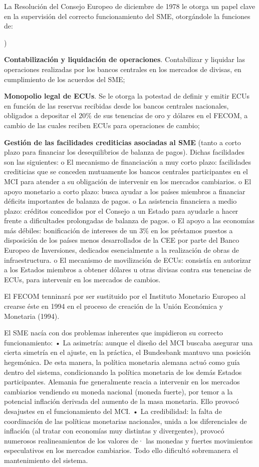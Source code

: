 \documentclass[10pt,a4paper]{article}
\newcounter{alphaitem}
\newenvironment{la}
      {\begin{list}{\alph{alphaitem})}{%
          \usecounter{alphaitem}%
          \setlength{\leftmargin}{1cm}%
          \setlength{\parskip}{3pt}%
          \setlength{\itemsep}{0pt}%
          \setlength{\parsep}{0pt}%
      }}
      {\end{list}}
\begin{document}
La Resolución del Consejo Europeo de diciembre de 1978 le otorga un papel clave en la supervisión del correcto funcionamiento del SME, otorgándole la funciones de:
\begin{la}
    \item \textbf{Contabilización y liquidación de operaciones}. Contabilizar y liquidar las operaciones realizadas por los bancos centrales en los mercados de divisas, en cumplimiento de los acuerdos del SME;
    \item \textbf{Monopolio legal de ECUs}. Se le otorga la potestad de definir y emitir ECUs en función de las reservas recibidas desde los bancos centrales nacionales, obligados a depositar el $20\%$ de sus tenencias de oro y dólares en el FECOM, a cambio de las cuales reciben ECUs para operaciones de cambio;
    \item \textbf{Gestión de las facilidades crediticias asociadas al SME} (tanto a corto plazo para financiar los desequilibrios de balanza de pagos). Dichas facilidades son las siguientes: o El mecanismo de financiación a muy corto plazo: facilidades crediticias que se conceden mutuamente los bancos centrales participantes en el MCI para atender a su obligación de intervenir en los mercados cambiarios. o El apoyo monetario a corto plazo: busca ayudar a los países miembros a financiar déficits importantes de balanza de pagos. o La asistencia financiera a medio plazo: créditos concedidos por el Consejo a un Estado para ayudarle a hacer frente a dificultades prolongadas de balanza de pagos. o El apoyo a las economías más débiles: bonificación de intereses de un $3\%$ en los préstamos puestos a disposición de los países menos desarrollados de la CEE por parte del Banco Europeo de Inversiones, dedicados esencialmente a la realización de obras de infraestructura. o El mecanismo de movilización de ECUs: consistía en autorizar a los Estados miembros a obtener dólares u otras divisas contra sus tenencias de ECUs, para intervenir en los mercados de cambios. 
\end{la}

El FECOM tenninará por ser sustituido por el Instituto Monetario Europeo al crearse éste en 1994 en el proceso de creación de la Unión Económica y Monetaria (1994).

El SME nacía con dos problemas inherentes que impidieron su correcto funcionamiento: 
• La asimetría: aunque el diseño del MCI buscaba asegurar una cierta simetría en el ajuste, en la práctica, el Bundesbank mantuvo una posición hegemónica. De esta manera, la política monetaria alemana actuó como guía dentro del sistema, condicionando la política monetaria de los demás Estados participantes. Alemania fue generalmente reacia a intervenir en los mercados cambiarios vendiendo su moneda nacional (moneda fuerte), por temor a la potencial inflación derivada del aumento de la masa monetaria. Ello provocó desajustes en el funcionamiento del MCI.
• La credibilidad: la falta de coordinación de las políticas monetarias nacionales, unida a los  diferenciales de inflación (al tratar con economías muy distintas y divergentes), provocó numerosos realineamientos de los valores de· las monedas y fuertes movimientos especulativos en los mercados cambiarios. Todo ello dificultó sobremanera el mantenimiento del sistema.
\end{document}
